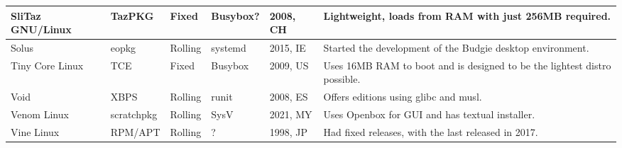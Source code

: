 \documentclass[12pt,a4paper,landscape]{article}
\begin{document}
\begin{longtable}{|p{3.5cm}|p{2.3cm}|p{1.6cm}|p{2.4cm}|p{2.0cm}|p{14.7cm}|}
			SliTaz GNU/Linux & TazPKG & Fixed & Busybox? & 2008, CH & Lightweight, loads from RAM with just 256MB required. \\\hline  
			Solus & eopkg & Rolling & systemd & 2015, IE & Started the development of the Budgie desktop environment. \\\hline
			Tiny Core Linux & TCE & Fixed & Busybox & 2009, US & Uses 16MB RAM to boot and is designed to be the lightest distro possible. \\\hline
			Void & XBPS & Rolling & runit & 2008, ES & Offers editions using glibc and musl. \\\hline
			Venom Linux & scratchpkg & Rolling & SysV & 2021, MY & Uses Openbox for GUI and has textual installer. \\\hline
			Vine Linux & RPM/APT & Rolling & ? & 1998, JP & Had fixed releases, with the last released in 2017. \\\hline
	\end{longtable}
	
\end{document}
